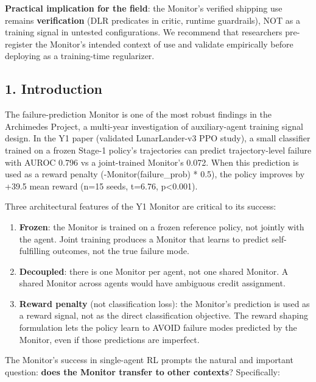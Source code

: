 \documentclass[11pt]{article}
\begin{document}
\textbf{Practical implication for the field}: the Monitor's verified
shipping use remains \textbf{verification} (DLR predicates in critic,
runtime guardrails), NOT as a training signal in untested
configurations. We recommend that researchers pre-register the Monitor's
intended context of use and validate empirically before deploying as a
training-time regularizer.

\subsection{1. Introduction}\label{introduction}

The failure-prediction Monitor is one of the most robust findings in the
Archimedes Project, a multi-year investigation of auxiliary-agent
training signal design. In the Y1 paper (validated LunarLander-v3 PPO
study), a small classifier trained on a frozen Stage-1 policy's
trajectories can predict trajectory-level failure with AUROC 0.796 vs a
joint-trained Monitor's 0.072. When this prediction is used as a reward
penalty (-Monitor(failure\_prob) * 0.5), the policy improves by +39.5
mean reward (n=15 seeds, t=6.76, p\textless0.001).

Three architectural features of the Y1 Monitor are critical to its
success:

\begin{enumerate}
\def\labelenumi{\arabic{enumi}.}

\item
  \textbf{Frozen}: the Monitor is trained on a frozen reference policy,
  not jointly with the agent. Joint training produces a Monitor that
  learns to predict self-fulfilling outcomes, not the true failure mode.
\item
  \textbf{Decoupled}: there is one Monitor per agent, not one shared
  Monitor. A shared Monitor across agents would have ambiguous credit
  assignment.
\item
  \textbf{Reward penalty} (not classification loss): the Monitor's
  prediction is used as a reward signal, not as the direct
  classification objective. The reward shaping formulation lets the
  policy learn to AVOID failure modes predicted by the Monitor, even if
  those predictions are imperfect.
\end{enumerate}

The Monitor's success in single-agent RL prompts the natural and
important question: \textbf{does the Monitor transfer to other
contexts}? Specifically:
\end{document}

